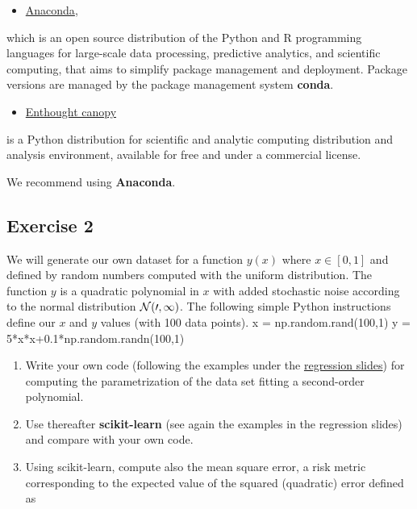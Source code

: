 \documentclass[%
oneside,                 %
final,                   %
10pt]{article}
\begin{document}
\begin{itemize}
\item \href{{https://docs.anaconda.com/}}{Anaconda}, 
\end{itemize}

\noindent
which is an open source
distribution of the Python and R programming languages for large-scale
data processing, predictive analytics, and scientific computing, that
aims to simplify package management and deployment. Package versions
are managed by the package management system \textbf{conda}. 

\begin{itemize}
\item \href{{https://www.enthought.com/product/canopy/}}{Enthought canopy} 
\end{itemize}

\noindent
is a Python
distribution for scientific and analytic computing distribution and
analysis environment, available for free and under a commercial
license.

We recommend using \textbf{Anaconda}.

\subsection{Exercise 2}

We will generate our own dataset for a function $y(x)$ where $x \in [0,1]$ and defined by random numbers computed with the uniform distribution. The function $y$ is a quadratic polynomial in $x$ with added stochastic noise according to the normal distribution $\cal {N}(0,1)$.
The following simple Python instructions define our $x$ and $y$ values (with 100 data points).
\bpycod
x = np.random.rand(100,1)
y = 5*x*x+0.1*np.random.randn(100,1)
\epycod

\begin{enumerate}
\item Write your own code (following the examples under the \href{{https://compphysics.github.io/MachineLearning/doc/pub/Regression/html/Regression-bs.html}}{regression slides}) for computing the parametrization of the data set fitting a second-order polynomial. 

\item Use thereafter \textbf{scikit-learn} (see again the examples in the regression slides) and compare with your own code.   

\item Using scikit-learn, compute also the mean square error, a risk metric corresponding to the expected value of the squared (quadratic) error defined as
\end{enumerate}
\end{document}
